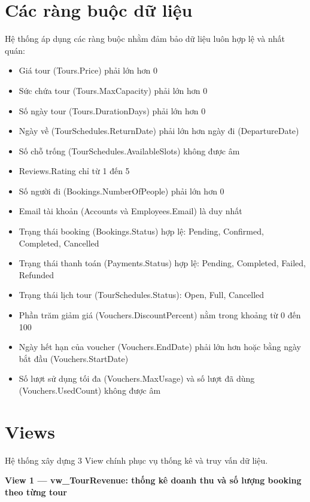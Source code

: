 \section{Các ràng buộc dữ liệu}\label{Sec2.3}

Hệ thống áp dụng các ràng buộc nhằm đảm bảo dữ liệu luôn hợp lệ và nhất quán:

\begin{itemize}
  \item Giá tour (Tours.Price) phải lớn hơn 0 
  \item Sức chứa tour (Tours.MaxCapacity) phải lớn hơn 0
  \item Số ngày tour (Tours.DurationDays) phải lớn hơn 0
  \item Ngày về (TourSchedules.ReturnDate) phải lớn hơn ngày đi (DepartureDate)
  \item Số chỗ trống (TourSchedules.AvailableSlots) không được âm
  \item Reviews.Rating chỉ từ 1 đến 5
  \item Số người đi (Bookings.NumberOfPeople) phải lớn hơn 0
  \item Email tài khoản (Accounts và Employees.Email) là duy nhất
  \item Trạng thái booking (Bookings.Status) hợp lệ: Pending, Confirmed, Completed, Cancelled
  \item Trạng thái thanh toán (Payments.Status) hợp lệ: Pending, Completed, Failed, Refunded
  \item Trạng thái lịch tour (TourSchedules.Status): Open, Full, Cancelled
  \item Phần trăm giảm giá (Vouchers.DiscountPercent) nằm trong khoảng từ 0 đến 100
  \item Ngày hết hạn của voucher (Vouchers.EndDate) phải lớn hơn hoặc bằng ngày bắt đầu (Vouchers.StartDate)
  \item Số lượt sử dụng tối đa (Vouchers.MaxUsage) và số lượt đã dùng (Vouchers.UsedCount) không được âm
\end{itemize}

\section{Views}\label{Sec2.4}

Hệ thống xây dựng 3 View chính phục vụ thống kê và truy vấn dữ liệu.

\noindent\textbf{View 1 — vw\_TourRevenue: thống kê doanh thu và số lượng booking theo từng tour}

